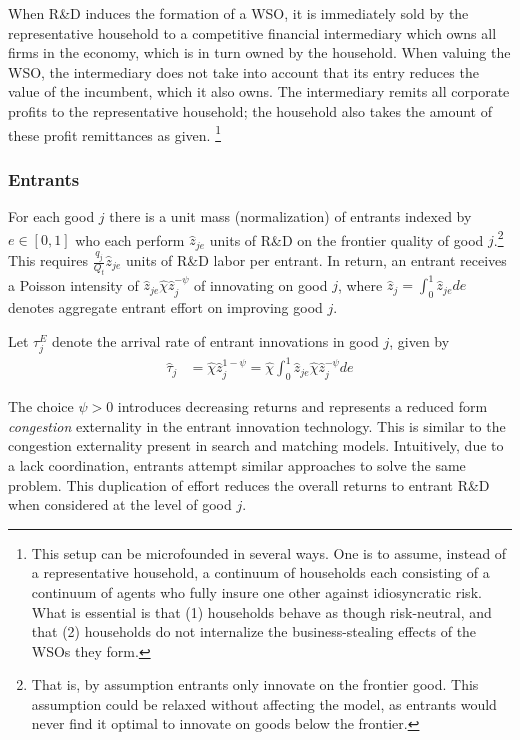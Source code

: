 \documentclass[11pt,english]{article}
\begin{document}
When R\&D induces the formation of a WSO, it is immediately sold by the representative household to a competitive financial intermediary which owns all firms in the economy, which is in turn owned by the household. When valuing the WSO, the intermediary does not take into account that its entry reduces the value of the incumbent, which it also owns. The intermediary remits all corporate profits to the representative household; the household also takes the amount of these profit remittances as given. \footnote{This setup can be microfounded in several ways. One is to assume, instead of a representative household, a continuum of households each consisting of a continuum of agents who fully insure one other against idiosyncratic risk. What is essential is that (1) households behave as though risk-neutral, and that (2) households do not internalize the business-stealing effects of the WSOs they form.} 



\subsubsection{Entrants} \label{subsubsec:entrants}

For each good $j$ there is a unit mass (normalization) of entrants indexed by $e \in [0,1]$ who each perform $\hat{z}_{je}$ units of R\&D on the frontier quality of good $j$.\footnote{That is, by assumption entrants only innovate on the frontier good. This assumption could be relaxed without affecting the model, as entrants would never find it optimal to innovate on goods below the frontier.} This requires $\frac{q_j}{Q_t}\hat{z}_{je}$ units of R\&D labor per entrant. In return, an entrant receives a Poisson intensity of $\hat{z}_{je} \hat{\chi} \hat{z}_j^{-\psi}$ of innovating on good $j$, where $\hat{z}_j = \int_0^1 \hat{z}_{je} de$ denotes aggregate entrant effort on improving good $j$. 

Let $\tau_j^E$ denote the arrival rate of entrant innovations in good $j$, given by
\begin{align}\label{model:entrantsInnovationTechnology}
	\hat{\tau}_j &= \hat{\chi} \hat{z}_j^{1-\psi} = \hat{\chi} \int_0^1 \hat{z}_{je} \hat{\chi} \hat{z}_j^{-\psi} de 
\end{align}

The choice $\psi > 0$ introduces decreasing returns and represents a reduced form \textit{congestion} externality in the entrant innovation technology. This is similar to the congestion externality present in search and matching models. Intuitively, due to a lack coordination, entrants attempt similar approaches to solve the same problem. This duplication of effort reduces the overall returns to entrant R\&D when considered at the level of good $j$.
\end{document}
